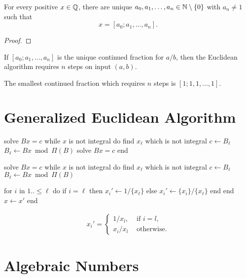 \begin{lemma}
  For every positive $x \in {\mathbb Q}$, there are unique
  $a_0, a_1, \dots, a_n \in {\mathbb N} \setminus \{0\}$ with $a_n \ne 1$
  such that
  \[
    x = [a_0; a_1, \dots, a_n].
  \]
\end{lemma}

\begin{proof}

\end{proof}

\begin{lemma}
  If $[a_0; a_1, \dots, a_n]$ is the unique continued fraction for $a/b$,
  then the Euclidean algorithm requires $n$ steps on input $(a, b)$.
\end{lemma}

\begin{lemma}
  The smallest continued fraction which requires $n$ steps is $[1; 1, 1, \dots, 1]$.
\end{lemma}

\section{Generalized Euclidean Algorithm}

\begin{Pseudocode}
solve $Bx = c$
while $x$ is not integral do
  find $x_\ell$ which is not integral
  $c \gets B_\ell$
  $B_\ell \gets Bx \bmod Π(B)$
  solve $Bx = c$
end
\end{Pseudocode}

\begin{Pseudocode}
solve $Bx = c$
while $x$ is not integral do
  find $x_\ell$ which is not integral
  $c \gets B_\ell$
  $B_\ell \gets Bx \bmod Π(B)$

  for $i$ in $1..{\le} \ell$ do
    if $i = \ell$ then
      $x_i' \gets 1 / \{x_\ell\}$
    else
      $x_i' \gets \{x_i\} / \{x_\ell\}$
    end
  end
  $x \gets x'$
end
\end{Pseudocode}

\begin{align*}
  x_i' = \begin{cases}
    1 / x_l, & \text{ if } i = l, \\
    x_i / x_l & \text{ otherwise.}
  \end{cases}
\end{align*}

\section{Algebraic Numbers}

